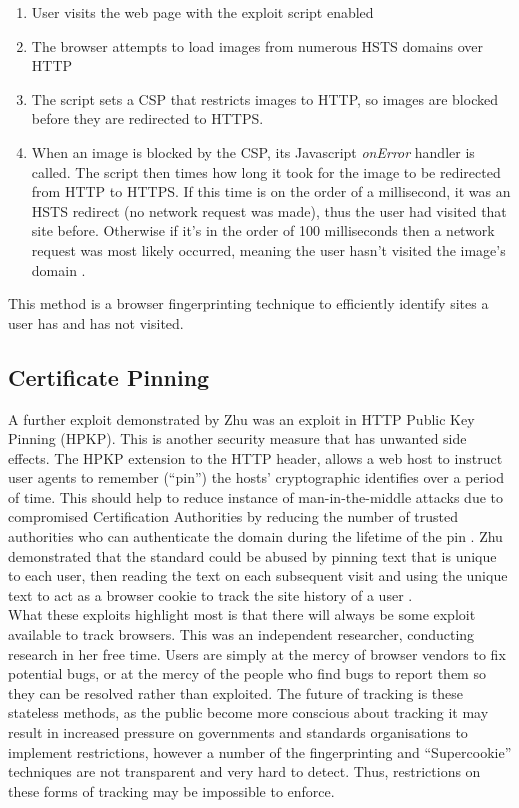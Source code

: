 \documentclass[12pt]{article}
\begin{document}
\begin{enumerate}
    \item User visits the web page with the exploit script enabled
    \item The browser attempts to load images from numerous HSTS domains over HTTP
    \item The script sets a CSP that restricts images to HTTP, so images are blocked before they are redirected to HTTPS. 
    \item When an image is blocked by the CSP, its Javascript \textit{onError} handler is called. The script then times how long it took for the image to be redirected from HTTP to HTTPS. If this time is on the order of a millisecond, it was an HSTS redirect (no network request was made), thus the user had visited that site before. Otherwise if it's in the order of 100 milliseconds then a network request was most likely occurred, meaning the user hasn't visited the image's domain \parencite{gitSniffly}. 
\end{enumerate} 

This method is a browser fingerprinting technique to efficiently identify sites a user has and has not visited.  \\

\subsection{Certificate Pinning}
A further exploit demonstrated by Zhu was an exploit in HTTP Public Key Pinning (HPKP). This is another security measure that has unwanted side effects. The HPKP extension to the HTTP header, allows a web host to instruct user agents to remember (``pin'') the hosts' cryptographic identifies over a period of time. This should help to reduce instance of man-in-the-middle attacks due to compromised Certification Authorities by reducing the number of trusted authorities who can authenticate the domain during the lifetime of the pin \parencite{HPKP}. Zhu demonstrated that the standard could be abused by pinning text that is unique to each user, then reading the text on each subsequent visit and using the unique text to act as a browser cookie to track the site history of a user \parencite{newTracking}. \\

What these exploits highlight most is that there will always be some exploit available to track browsers. This was an independent researcher, conducting research in her free time. Users are simply at the mercy of browser vendors to fix potential bugs, or at the mercy of the people who find bugs to report them so they can be resolved rather than exploited. The future of tracking is these stateless methods, as the public become more conscious about tracking it may result in increased pressure on governments and standards organisations to implement restrictions, however a number of the fingerprinting and ``Supercookie'' techniques are not transparent and very hard to detect. Thus, restrictions on these forms of tracking may be impossible to enforce. 
\end{document}
